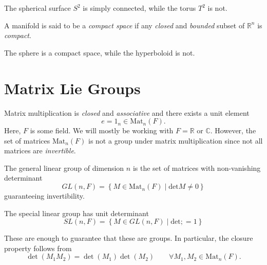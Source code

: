 
\begin{example}[]
The spherical surface $S^2$ is simply connected, while the torus $T^2$ is not.
\end{example}

\begin{definition}[compact]
  A manifold is said to be a \emph{compact space} if any \emph{closed} and \emph{bounded} subset of $\mathbb{R}^n$ is \emph{compact}.
\end{definition}


\begin{example}[]
The sphere is a compact space, while the hyperboloid is not.
\end{example}

\section{Matrix Lie Groups}%
\label{sec:matrix_lie_groups}

Matrix multiplication is \emph{closed} and \emph{associative} and there exists a unit element
\begin{equation}
  e = 1_n \in \text{Mat}_n(F).
\end{equation}
Here, $F$ is some field. We will mostly be working with $F = \mathbb{R}$ or $\mathbb{C}$.
However, the set of matrices $\text{Mat}_n(F)$ is not a group under matrix multiplication since not all matrices are \emph{invertible}.

\begin{definition}
The general linear group of dimension $n$ is the set of matrices with non-vanishing determinant
\begin{equation}
  GL(n, F) = \left\{ M \in \text{Mat}_n(F) \mid \text{det}M \neq 0 \right\}
\end{equation}
guaranteeing invertibility.
\end{definition}

\begin{definition}
The special linear group has unit determinant
\begin{equation}
  SL(n, F) = \left\{ M \in GL(n, F) \mid \text{det}; = 1 \right\}
\end{equation}
\end{definition}

These are enough to guarantee that these are groups. In particular, the closure property follows from
\begin{equation}
  \det(M_1 M_2) = \det(M_1) \det(M_2) \qquad \forall M_1, M_2 \in \text{Mat}_n(F).
\end{equation}

